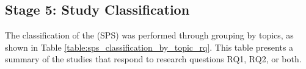 \subsection{Stage 5: Study Classification}\label{subsec:clasificacion-de-estudios}
The classification of the (SPS) was performed through grouping by topics, as shown in Table \ref{table:sps_classification_by_topic_rq}. This table presents a summary of the studies that respond to research questions RQ1, RQ2, or both.

